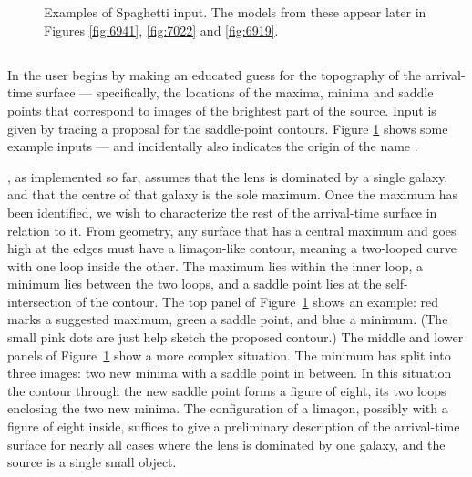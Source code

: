\begin{figure}
  \centering
   \\
   \\
  \caption{Examples of Spaghetti input.  The models from these appear
    later in Figures \ref{fig:6941}, \ref{fig:7022} and \ref{fig:6919}.
  \label{fig:input-spag}}
\end{figure}

\subsection{\spl} \label{sec:SpaghettiLens}

In \spl the user begins by making an educated guess for the topography
of the arrival-time surface --- specifically, the locations of the
maxima, minima and saddle points that correspond to images of the
brightest part of the source.  Input is given by tracing a proposal
for the saddle-point contours.  Figure \ref{fig:input-spag} shows some
example inputs --- and incidentally also indicates the origin of the
name \spl.

\spl, as implemented so far, assumes that the lens is dominated by a
single galaxy, and that the centre of that galaxy is the sole maximum.
Once the maximum has been identified, we wish to characterize the rest
of the arrival-time surface in relation to it.  From geometry, any
surface that has a central maximum and goes high at the edges must
have a lima\c con-like contour, meaning a two-looped curve with one
loop inside the other.  The maximum lies within the inner loop, a
minimum lies between the two loops, and a saddle point lies at the
self-intersection of the contour.  The top panel of
Figure~\ref{fig:input-spag} shows an example: red marks a suggested
maximum, green a saddle point, and blue a minimum.  (The small pink
dots are just help sketch the proposed contour.)  The middle and lower
panels of Figure~\ref{fig:input-spag} show a more complex situation.
The minimum has split into three images: two new minima with a saddle
point in between.  In this situation the contour through the new
saddle point forms a figure of eight, its two loops enclosing the two
new minima.  The configuration of a lima\c con, possibly with a figure
of eight inside, suffices to give a preliminary description of the
arrival-time surface for nearly all cases where the lens is dominated
by one galaxy, and the source is a single small object.



